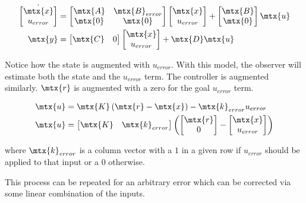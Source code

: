 \begin{align*}
  \dot{\begin{bmatrix}
    \mtx{x} \\
    u_{error}
  \end{bmatrix}} &=
  \begin{bmatrix}
    \mtx{A} & \mtx{B}_{error} \\
    \mtx{0} & \mtx{0}
  \end{bmatrix}
  \begin{bmatrix}
    \mtx{x} \\
    u_{error}
  \end{bmatrix} +
  \begin{bmatrix}
    \mtx{B} \\
    \mtx{0}
  \end{bmatrix}
  \mtx{u} \\
  \mtx{y} &= \begin{bmatrix}
    \mtx{C} & 0
  \end{bmatrix} \begin{bmatrix}
    \mtx{x} \\
    u_{error}
  \end{bmatrix} + \mtx{D}\mtx{u}
\end{align*}

Notice how the \gls{state} is augmented with $u_{error}$. With this \gls{model},
the \gls{observer} will estimate both the \gls{state} and the $u_{error}$ term.
The controller is augmented similarly. $\mtx{r}$ is augmented with a zero for
the goal $u_{error}$ term.

\begin{align*}
  \mtx{u} &= \mtx{K} \left(\mtx{r} - \mtx{x}\right) - \mtx{k}_{error}u_{error}
    \\
  \mtx{u} &=
  \begin{bmatrix}
    \mtx{K} & \mtx{k}_{error}
  \end{bmatrix}
  \left(\begin{bmatrix}
    \mtx{r} \\
    0
  \end{bmatrix} -
  \begin{bmatrix}
    \mtx{x} \\
    u_{error}
  \end{bmatrix}\right)
\end{align*}

where $\mtx{k}_{error}$ is a column vector with a $1$ in a given row if
$u_{error}$ should be applied to that \gls{input} or a $0$ otherwise.

This process can be repeated for an arbitrary \gls{error} which can be corrected
via some linear combination of the \glspl{input}.
